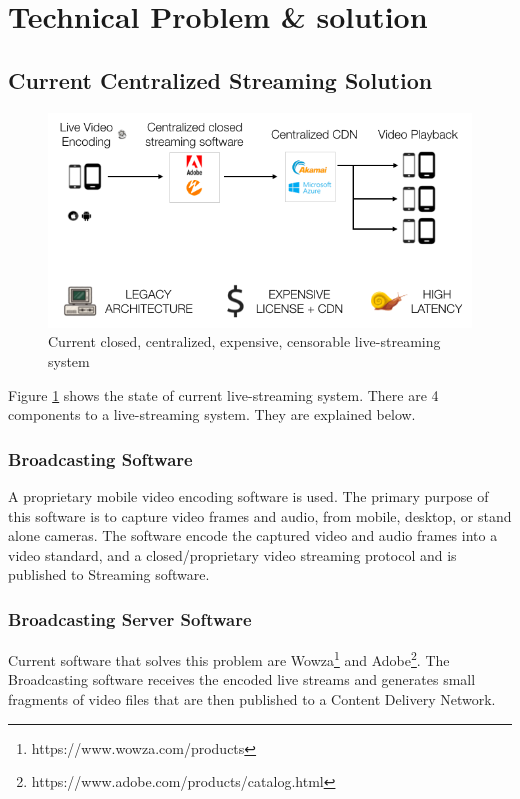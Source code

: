 \documentclass{article}
\begin{document}
\section{Technical Problem \& solution}


\subsection{Current Centralized Streaming Solution}

\begin{figure}[h!]
 \centering
 \includegraphics[width=1.0\textwidth]{static/problem-architecture-trans}
 \caption{Current closed, centralized, expensive, censorable live-streaming system}
 \label{image:problem-architecture-trans}
\end{figure}

Figure \ref{image:problem-architecture-trans} shows the state of current live-streaming system. There are 4 components to a live-streaming system. They are explained below.
\subsubsection{Broadcasting Software}
A proprietary mobile video encoding software is used. The primary purpose of this software is to capture video frames and audio, from mobile, desktop, or stand alone cameras. The software encode the captured video and audio frames into a video standard, and a closed/proprietary video streaming protocol and is published to Streaming software.

\subsubsection{Broadcasting Server Software}
Current software that solves this problem are Wowza\footnote{https://www.wowza.com/products} and Adobe\footnote{https://www.adobe.com/products/catalog.html}. The Broadcasting software receives the encoded live streams and generates small fragments of video files that are then published to a Content Delivery Network.
\end{document}
